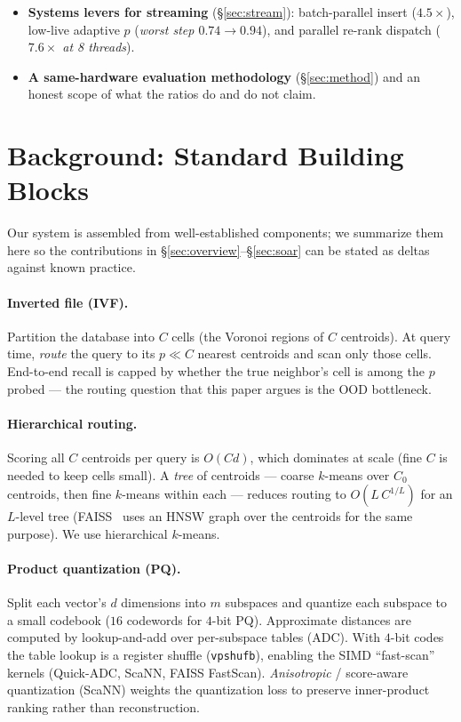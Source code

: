 \documentclass{article}
\begin{document}
\begin{itemize}
{    graph in $24$ min from random init, or $0.904$ in ${\sim}43$ min total ($35$-min routed
    self-$k$NN pass $+$ $8$ min descent) --- either under HNSW's own $48$-min build --- and
    $0.965$ at 35M in $9.5$ min; the 10M/35M wins are fully self-contained.}
  \item \textbf{Systems levers for streaming} (\S\ref{sec:stream}): batch-parallel
    insert (\emph{$4.5\times$}), low-live adaptive $p$ (\emph{worst step
    $0.74\to0.94$}), and parallel re-rank dispatch (\emph{$7.6\times$ at 8 threads}).
  \item \textbf{A same-hardware evaluation methodology} (\S\ref{sec:method}) and an
    honest scope of what the ratios do and do not claim.
\end{itemize}

\section{Background: Standard Building Blocks}
\label{sec:bg}
Our system is assembled from well-established components; we summarize them here so
the contributions in \S\ref{sec:overview}--\S\ref{sec:soar} can be stated as deltas
against known practice.

\paragraph{Inverted file (IVF).} Partition the database into $C$ cells (the Voronoi
regions of $C$ centroids). At query time, \emph{route} the query to its $p\!\ll\!C$
nearest centroids and scan only those cells. End-to-end recall is capped by whether
the true neighbor's cell is among the $p$ probed --- the routing question that this
paper argues is the OOD bottleneck.

\paragraph{Hierarchical routing.} Scoring all $C$ centroids per query is $O(Cd)$,
which dominates at scale (fine $C$ is needed to keep cells small). A \emph{tree} of
centroids --- coarse $k$-means over $C_0$ centroids, then fine $k$-means within each
--- reduces routing to $O(L\,C^{1/L})$ for an $L$-level tree (FAISS~\cite{faiss} uses an
HNSW graph over the centroids for the same purpose). We use hierarchical $k$-means.

\paragraph{Product quantization (PQ).} Split each vector's $d$ dimensions into $m$
subspaces and quantize each subspace to a small codebook ($16$ codewords for
$4$-bit PQ). Approximate distances are computed by lookup-and-add over per-subspace
tables (ADC). With $4$-bit codes the table lookup is a register shuffle
(\texttt{vpshufb}), enabling the SIMD ``fast-scan'' kernels (Quick-ADC, ScaNN, FAISS
FastScan). \emph{Anisotropic} / score-aware quantization (ScaNN) weights the
quantization loss to preserve inner-product ranking rather than reconstruction.
\end{document}
